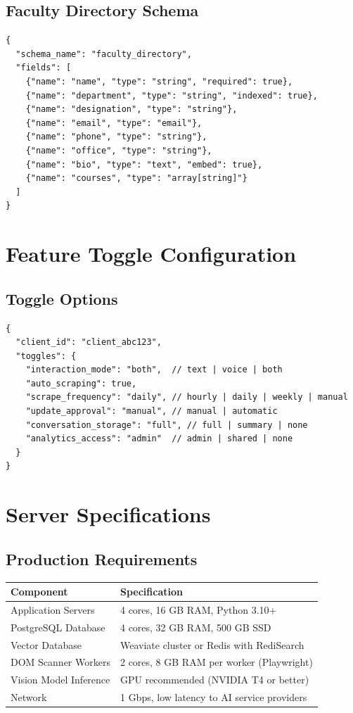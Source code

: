 \section{Faculty Directory Schema}

\begin{lstlisting}
{
  "schema_name": "faculty_directory",
  "fields": [
    {"name": "name", "type": "string", "required": true},
    {"name": "department", "type": "string", "indexed": true},
    {"name": "designation", "type": "string"},
    {"name": "email", "type": "email"},
    {"name": "phone", "type": "string"},
    {"name": "office", "type": "string"},
    {"name": "bio", "type": "text", "embed": true},
    {"name": "courses", "type": "array[string]"}
  ]
}
\end{lstlisting}

\chapter{Feature Toggle Configuration}

\section{Toggle Options}

\begin{lstlisting}
{
  "client_id": "client_abc123",
  "toggles": {
    "interaction_mode": "both",  // text | voice | both
    "auto_scraping": true,
    "scrape_frequency": "daily", // hourly | daily | weekly | manual
    "update_approval": "manual", // manual | automatic
    "conversation_storage": "full", // full | summary | none
    "analytics_access": "admin"  // admin | shared | none
  }
}
\end{lstlisting}

\chapter{Server Specifications}

\section{Production Requirements}

\begin{table}[H]
\centering
\begin{tabular}{|l|l|}
\hline
\textbf{Component} & \textbf{Specification} \\
\hline
Application Servers & 4 cores, 16 GB RAM, Python 3.10+ \\
\hline
PostgreSQL Database & 4 cores, 32 GB RAM, 500 GB SSD \\
\hline
Vector Database & Weaviate cluster or Redis with RediSearch \\
\hline
DOM Scanner Workers & 2 cores, 8 GB RAM per worker (Playwright) \\
\hline
Vision Model Inference & GPU recommended (NVIDIA T4 or better) \\
\hline
Network & 1 Gbps, low latency to AI service providers \\
\hline
\end{tabular}
\end{table}


